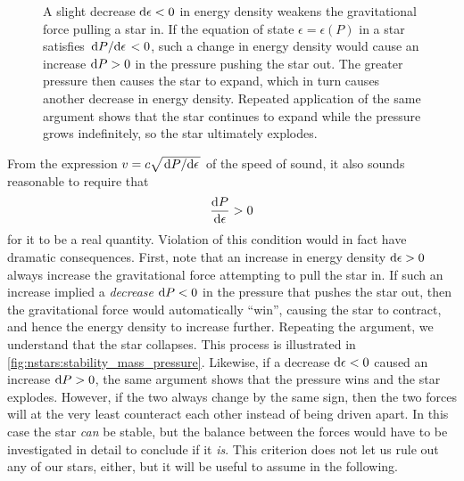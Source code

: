 \usetikzlibrary{arrows.meta}
\usetikzlibrary{shapes.symbols}
\begin{figure}
\caption{\label{fig:nstars:star_explosion}%
A slight decrease $\mathop{}\!\mathrm{d} \epsilon < 0$ in energy density weakens the gravitational force pulling a star in.
If the equation of state $\epsilon = \epsilon(P)$ in a star satisfies $\odv{P}/{\epsilon} < 0$, such a change in energy density would cause an increase $\mathop{}\!\mathrm{d} P > 0$ in the pressure pushing the star out.
The greater pressure then causes the star to expand, which in turn causes another decrease in energy density.
Repeated application of the same argument shows that the star continues to expand while the pressure grows indefinitely, so the star ultimately explodes.
}
\end{figure}

From the expression $v = c \sqrt{\odv{P}/{\epsilon}}$ of the speed of sound, it also sounds reasonable to require that
\begin{equation}
	\odv{P}{\epsilon} > 0
\label{eq:nstars:stability_pressure_energy_density}
\end{equation}
for it to be a real quantity.
Violation of this condition would in fact have dramatic consequences.
First, note that an increase in energy density $\mathop{}\!\mathrm{d} \epsilon > 0$ always increase the gravitational force attempting to pull the star in.
If such an increase implied a \emph{decrease} $\mathop{}\!\mathrm{d} P < 0$ in the pressure that pushes the star out, then the gravitational force would automatically ``win'', causing the star to contract, and hence the energy density to increase further.
Repeating the argument, we understand that the star collapses.
This process is illustrated in \cref{fig:nstars:stability_mass_pressure}.
Likewise, if a decrease $\mathop{}\!\mathrm{d} \epsilon < 0$ caused an increase $\mathop{}\!\mathrm{d} P > 0$, the same argument shows that the pressure wins and the star explodes.
However, if the two always change by the same sign, then the two forces will at the very least counteract each other instead of being driven apart.
In this case the star \emph{can} be stable, but the balance between the forces would have to be investigated in detail to conclude if it \emph{is}.
This criterion does not let us rule out any of our stars, either, but it will be useful to assume  in the following.

